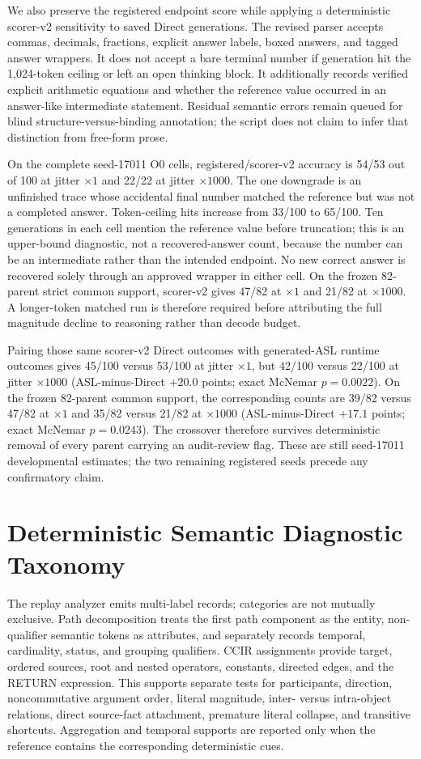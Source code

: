 \documentclass[11pt]{article}
\begin{document}
We also preserve the registered endpoint score while applying a deterministic
scorer-v2 sensitivity to saved Direct generations.  The revised parser accepts
commas, decimals, fractions, explicit answer labels, boxed answers, and tagged
answer wrappers.  It does not accept a bare terminal number if generation hit
the 1,024-token ceiling or left an open thinking block.  It additionally records
verified explicit arithmetic equations and whether the reference value occurred
in an answer-like intermediate statement.  Residual semantic errors remain
queued for blind structure-versus-binding annotation; the script does not claim
to infer that distinction from free-form prose.

On the complete seed-17011 O0 cells, registered/scorer-v2 accuracy is 54/53 out
of 100 at jitter $\times1$ and 22/22 at jitter $\times1000$.  The one downgrade
is an unfinished trace whose accidental final number matched the reference but
was not a completed answer.  Token-ceiling hits increase from 33/100 to 65/100.
Ten generations in each cell mention the reference value before truncation;
this is an upper-bound diagnostic, not a recovered-answer count, because the
number can be an intermediate rather than the intended endpoint.  No new correct
answer is recovered solely through an approved wrapper in either cell.  On the
frozen 82-parent strict common support, scorer-v2 gives 47/82 at
$\times1$ and 21/82 at $\times1000$.  A longer-token matched run is therefore
required before attributing the full magnitude decline to reasoning rather than
decode budget.

Pairing those same scorer-v2 Direct outcomes with generated-ASL runtime outcomes
gives 45/100 versus 53/100 at jitter $\times1$, but 42/100 versus 22/100 at
jitter $\times1000$ (ASL-minus-Direct $+20.0$ points; exact McNemar
$p=0.0022$).  On the frozen 82-parent common support, the corresponding
counts are 39/82 versus 47/82 at $\times1$ and 35/82 versus 21/82 at
$\times1000$ (ASL-minus-Direct $+17.1$ points; exact McNemar $p=0.0243$).
The crossover therefore survives deterministic removal of every parent carrying
an audit-review flag.  These are still seed-17011 developmental estimates;
the two remaining registered seeds precede any confirmatory claim.

\section{Deterministic Semantic Diagnostic Taxonomy}

The replay analyzer emits multi-label records; categories are not mutually
exclusive. Path decomposition treats the first path component as the entity,
non-qualifier semantic tokens as attributes, and separately records temporal,
cardinality, status, and grouping qualifiers. CCIR assignments provide target,
ordered sources, root and nested operators, constants, directed edges, and the
RETURN expression. This supports separate tests for participants, direction,
noncommutative argument order, literal magnitude, inter- versus intra-object
relations, direct source-fact attachment, premature literal collapse, and
transitive shortcuts. Aggregation and temporal supports are reported only when
the reference contains the corresponding deterministic cues.
\end{document}
